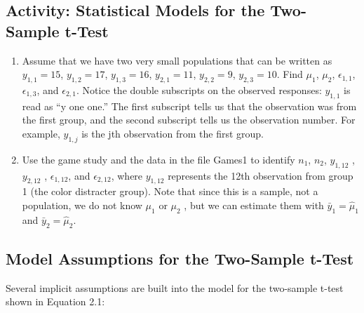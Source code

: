 \documentclass[
]{book}
\begin{document}
\hypertarget{activity-statistical-models-for-the-two-sample-t-test}{%
\subsection*{Activity: Statistical Models for the Two-Sample t-Test}\label{activity-statistical-models-for-the-two-sample-t-test}}

\begin{enumerate}
\def\labelenumi{\arabic{enumi}.}
\setcounter{enumi}{4}
\item
  Assume that we have two very small populations that can be written as
  \(y_{1,1} = 15\), \(y_{1,2} = 17\), \(y_{1,3} = 16\), \(y_{2,1} = 11\), \(y_{2,2} = 9\), \(y_{2,3} = 10\). Find \(\mu_1\), \(\mu_2\), \(\epsilon_{1, 1}\), \(\epsilon_{1, 3}\), and \(\epsilon_{2, 1}\). Notice the double subscripts on the observed responses: \(y_{1,1}\) is read as ``y one one.'' The first subscript tells us that the observation was from the first group, and the second subscript tells us the observation number. For example, \(y_{1,j}\) is the jth observation from the first group.
\item
  Use the game study and the data in the file Games1 to identify \(n_1\), \(n_2\), \(y_{1,12}\) , \(y_{2,12}\) , \(\epsilon_{1, 12}\), and \(\epsilon_{2, 12}\),
  where \(y_{1,12}\) represents the 12th observation from group 1 (the color distracter group). Note that since this is a sample, not a population, we do not know \(\mu_1\) or \(\mu_2\) , but we can estimate them with \(\bar{y}_1 = \hat{\mu}_1\) and \(\bar{y}_2 = \hat{\mu}_2\).
\end{enumerate}

\hypertarget{model-assumptions-for-the-two-sample-t-test}{%
\subsection*{Model Assumptions for the Two-Sample t-Test}\label{model-assumptions-for-the-two-sample-t-test}}

Several implicit assumptions are built into the model for the two-sample t-test shown in Equation 2.1:
\end{document}
